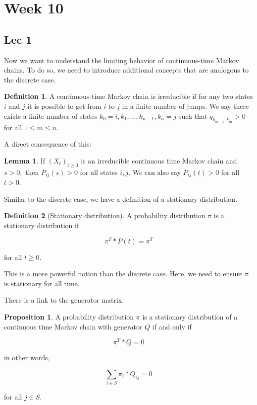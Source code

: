 \documentclass[12pt]{article}
\theoremstyle{definition}
\newtheorem{definition}{Definition}[section]
\newtheorem{lemma}[theorem]{Lemma}
\newtheorem{proposition}{Proposition}[section]
\begin{document}
\section{Week 10}
\subsection{Lec 1}

Now we want to understand the limiting behavior of continuous-time Markov chains. To do so, we need to introduce additional concepts that are analogous to the discrete case.

\begin{definition}
  A continuous-time Markov chain is irreducible if for any two states $i$ and $j$ it is possible to get from $i$ to $j$ in a finite number of jumps. We say there exists a finite number of states $k_0 = i, k_1, \dots, k_{n-1}, k_{n} = j$ such that $q_{k_{m-1}, k_m} > 0$ for all $1 \leq m \leq n$.
\end{definition}

A direct consequence of this:

\begin{lemma}
  If $(X_t)_{t \geq 0} $ is an irreducible continuous time Markov chain and $s >0, $ then $P_{ij}(s) > 0$ for all states $i,j$. We can also say $P_{ij}(t) > 0$ for all $t > 0$.
\end{lemma}

Similar to the discrete case, we have a definition of a stationary distribution.

\begin{definition}[Stationary distribution]
  A probability distribution $\pi$ is a stationary distribution if

  $$
  \pi^T * P(t) = \pi^T
  $$

  for all $t \geq 0$.
\end{definition}

This is a more powerful notion than the discrete case. Here, we need to ensure $\pi$ is stationary for all time.

There is a link to the generator matrix.

\begin{proposition}
  A probability distribution $\pi$ is a stationary distribution of a continuous time Markov chain with generator $Q$ if and only if

  $$
  \pi^T * Q = 0
  $$

  in other words,

  $$
  \sum_{i \in S} \pi_i * Q_{ij} = 0
  $$

  for all $j \in S$.
\end{proposition}
\end{document}
